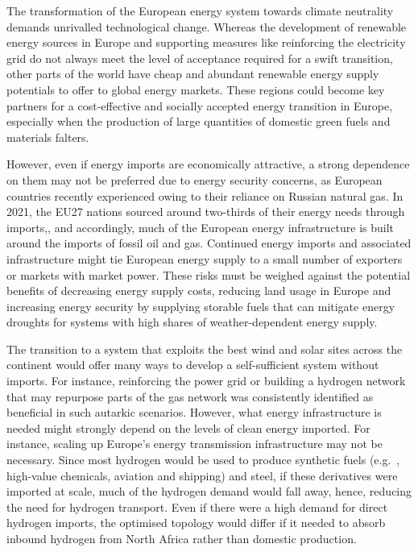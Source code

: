 
The transformation of the European energy system towards climate neutrality
demands unrivalled technological change. Whereas the development of renewable
energy sources in Europe and supporting measures like reinforcing the
electricity grid do not always meet the level of acceptance required for a swift
transition, other parts of the world have cheap and abundant renewable energy
supply potentials to offer to global energy
markets.\cite{irenaGlobalHydrogen2022,luxSupplyCurves2021,vanderzwaanTimmermansDream2021,fasihiLongTermHydrocarbon2017,reichenbergDeepDecarbonization2022,galvanExportingSunshine2022,armijoFlexibleProduction2020,pfennigGlobalGISbased2022}
These regions could become key partners for a cost-effective and socially
accepted energy transition in Europe, especially when the production of large
quantities of domestic green fuels and materials falters.


However, even if energy imports are economically attractive, a strong dependence
on them may not be preferred due to energy security concerns, as European
countries recently experienced owing to their reliance on Russian natural
gas.\cite{pedersenLongtermImplications2022} In 2021, the EU27 nations sourced
around two-thirds of their energy needs through
imports,\cite{eurostatCompleteEnergy2023}, and accordingly, much of the European
energy infrastructure is built around the imports of fossil oil and gas.
Continued energy imports and associated infrastructure might tie European energy
supply to a small number of exporters or markets with market power. These risks
must be weighed against the potential benefits of decreasing energy supply
costs, reducing land usage in Europe and increasing energy security by supplying
storable fuels that can mitigate energy droughts for systems with high shares of
weather-dependent energy supply.


The transition to a system that exploits the best wind and solar sites across
the continent would offer many ways to develop a self-sufficient system without
imports.\cite{pickeringDiversityOptions2022,trondleHomemadeImported2019,brownSynergiesSector2018}
For instance, reinforcing the power grid or building a hydrogen network that may
repurpose parts of the gas network was consistently identified as beneficial in
such autarkic
scenarios.\cite{neumannPotentialRole2023,victoriaSpeedTechnological2022}
However, what energy infrastructure is needed might strongly depend on the
levels of clean energy imported. For instance, scaling up Europe's energy
transmission infrastructure may not be necessary. Since most hydrogen would be
used to produce synthetic fuels (e.g.~, high-value chemicals, aviation and
shipping) and steel,\cite{neumannPotentialRole2023} if these derivatives were
imported at scale, much of the hydrogen demand would fall away, hence, reducing
the need for hydrogen transport. Even if there were a high demand for direct
hydrogen imports, the optimised topology would differ if it needed to absorb
inbound hydrogen from North Africa rather than domestic production.

